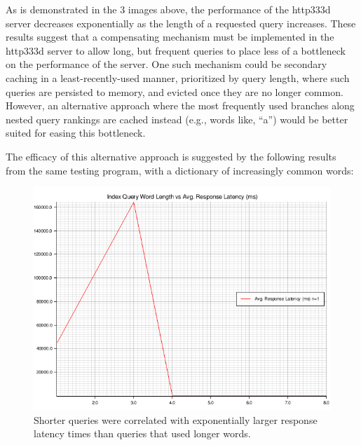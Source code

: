 \documentclass{article}
\begin{document}
\bigbreak{}

As is demonstrated in the 3 images above, the performance of the http333d
server decreases exponentially as the length of a requested query increases.
These results suggest that a compensating mechanism must be implemented in the
http333d server to allow long, but frequent queries to place less of a
bottleneck on the performance of the server. One such mechanism could be
secondary caching in a least-recently-used manner, prioritized by query length,
where such queries are persisted to memory, and evicted once they are no longer
common. However, an alternative approach where the most frequently used
branches along nested query rankings are cached instead (e.g., words like,
``a'') would be better suited for easing this bottleneck.

The efficacy of this alternative approach is suggested by the following results
from the same testing program, with a dictionary of increasingly common words:

\begin{figure}[t]
	\begin{center}
	\includegraphics[width=1\linewidth]{media/big_dictionary.png}
		\caption{Shorter queries were correlated with exponentially larger response latency times than queries that used longer words.}
	\end{center}
\end{figure}
\end{document}
